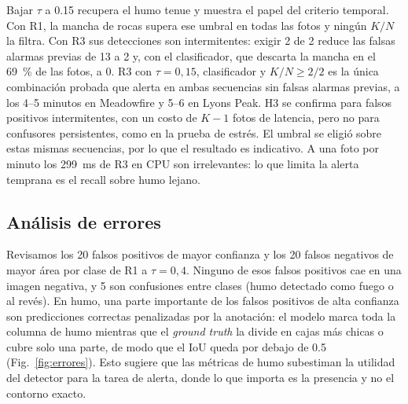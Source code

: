 \documentclass[conference,a4paper]{IEEEtran}
\begin{document}
Bajar $\tau$ a \num{0.15} recupera el humo tenue y muestra el papel del criterio temporal. Con R1, la mancha de rocas supera ese umbral en todas las fotos y ningún $K/N$ la filtra. Con R3 sus detecciones son intermitentes: exigir 2 de 2 reduce las falsas alarmas previas de 13 a 2 y, con el clasificador, que descarta la mancha en el \SI{69}{\percent} de las fotos, a 0. R3 con $\tau=0{,}15$, clasificador y $K/N\ge 2/2$ es la única combinación probada que alerta en ambas secuencias sin falsas alarmas previas, a los 4--5 minutos en Meadowfire y 5--6 en Lyons Peak. H3 se confirma para falsos positivos intermitentes, con un costo de $K-1$ fotos de latencia, pero no para confusores persistentes, como en la prueba de estrés. El umbral se eligió sobre estas mismas secuencias, por lo que el resultado es indicativo. A una foto por minuto los \SI{299}{ms} de R3 en CPU son irrelevantes: lo que limita la alerta temprana es el recall sobre humo lejano.

\subsection{Análisis de errores}


Revisamos los 20 falsos positivos de mayor confianza y los 20 falsos negativos de mayor área por clase de R1 a $\tau=0{,}4$. Ninguno de esos falsos positivos cae en una imagen negativa, y 5 son confusiones entre clases (humo detectado como fuego o al revés). En humo, una parte importante de los falsos positivos de alta confianza son predicciones correctas penalizadas por la anotación: el modelo marca toda la columna de humo mientras que el \textit{ground truth} la divide en cajas más chicas o cubre solo una parte, de modo que el IoU queda por debajo de \num{0.5} (Fig.~\ref{fig:errores}). Esto sugiere que las métricas de humo subestiman la utilidad del detector para la tarea de alerta, donde lo que importa es la presencia y no el contorno exacto.
\end{document}
